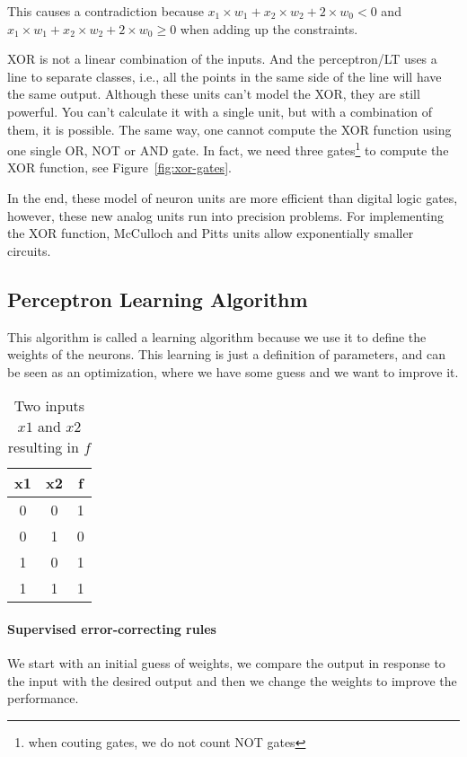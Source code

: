 \documentclass[main]{subfiles}
\begin{document}
This causes a contradiction because $x_1 \times w_1 + x_2 \times w_2 + 2 \times w_0 < 0$ and $x_1 \times w_1 + x_2 \times w_2 + 2 \times w_0 \geq 0$ when adding up the constraints.

XOR is not a linear combination of the inputs.
And the perceptron/LT uses a line to separate classes, i.e., all the points in the same side of the line will have the same output.
Although these units can't model the XOR, they are still powerful.
You can't calculate it with a single unit, but with a combination of them, it is possible.
The same way, one cannot compute the XOR function using one single OR, NOT or AND gate.
In fact, we need three gates\footnote{when couting gates, we do not count NOT gates} to compute the XOR function, see Figure~\ref{fig:xor-gates}.

In the end, these model of neuron units are more efficient than digital logic gates, however, these new analog units run into precision problems.
For implementing the XOR function, McCulloch and Pitts units allow exponentially smaller circuits.

\subsection{Perceptron Learning Algorithm}

This algorithm is called a learning algorithm because we use it to define the weights of the neurons.
This learning is just a definition of parameters, and can be seen as an optimization, where we have some guess and we want to improve it.

\begin{table}[H]
\centering
\begin{tabular}{cc|c}
x1 & x2 & f \\ 
\hline
0  & 0  & 1 \\
0  & 1  & 0 \\
1  & 0  & 1 \\
1  & 1  & 1 \\ 
\end{tabular}
\caption{Two inputs $x1$ and $x2$ resulting in $f$}
\label{tab:simple_function}
\end{table}

\paragraph{Supervised error-correcting rules}
We start with an initial guess of weights, we compare the output in response to the input with the desired output and then we change the weights to improve the performance. \\
\end{document}
